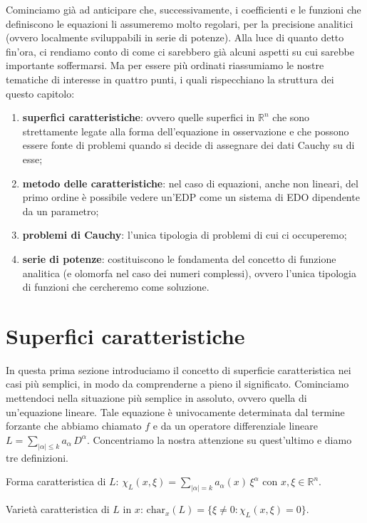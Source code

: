 Cominciamo già ad anticipare che, successivamente, i coefficienti e le funzioni che definiscono le equazioni li assumeremo molto regolari, per la precisione analitici (ovvero localmente sviluppabili in serie di potenze).
\newpage
Alla luce di quanto detto fin'ora, ci rendiamo conto di come ci sarebbero già alcuni aspetti su cui sarebbe importante soffermarsi.
Ma per essere più ordinati riassumiamo le nostre tematiche di interesse in quattro punti, i quali rispecchiano la struttura dei questo capitolo:
\begin{enumerate}
\item \textbf{superfici caratteristiche}: ovvero quelle superfici in $\mathbb{R}^n$ che sono strettamente legate alla forma dell'equazione in osservazione e che possono essere fonte di problemi quando si decide di assegnare dei dati Cauchy su di esse;
\item \textbf{metodo delle caratteristiche}: nel caso di equazioni, anche non lineari, del primo ordine è possibile vedere un'EDP come un sistema di EDO dipendente da un parametro;
\item \textbf{problemi di Cauchy}: l'unica tipologia di problemi di cui ci occuperemo;
\item \textbf{serie di potenze}: costituiscono le fondamenta del concetto di funzione analitica (e olomorfa nel caso dei numeri complessi), ovvero l'unica tipologia di funzioni che cercheremo come soluzione. 
\end{enumerate}


\section{Superfici caratteristiche}
In questa prima sezione introduciamo il concetto di superficie caratteristica nei casi più semplici, in modo da comprenderne a pieno il significato. Cominciamo mettendoci nella situazione più semplice in assoluto, ovvero quella di un'equazione lineare. 
Tale equazione è univocamente determinata dal termine forzante che abbiamo chiamato $f$ e da un operatore differenziale lineare $L=\sum_{|\alpha |\leq k} a_\alpha \, D^\alpha$. Concentriamo la nostra attenzione su quest'ultimo e diamo tre definizioni.

\begin{definition}
Forma caratteristica di $L$:  $\chi_L(x,\xi)=\sum_{|\alpha |= k} a_\alpha(x) \, \xi^\alpha$ con  $x,\xi \in \mathbb{R}^n$.
\end{definition}

\begin{definition}
Varietà caratteristica di $L$ in $x$: $\text{char}_x (L)= \{ \xi \neq 0 : \chi_L(x,\xi)=0 \}$.
\end{definition}

